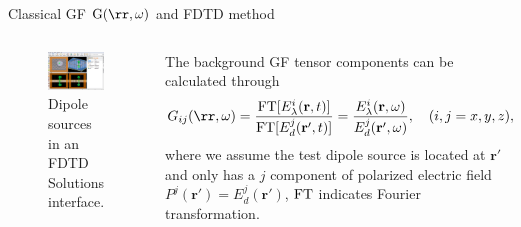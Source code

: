 \documentclass{beamer}
\begin{document}
\begin{frame}{Classical GF $\mathrm{G}(\rr,\omega)$ and FDTD method}
\begin{columns}

 \begin{figure}[htp]%
  \centering
 \begin{center}
 \includegraphics[width=0.99\textwidth]{./Figs/pc_3d_cavity_pc}%
 \end{center}
 \caption[A diagram of FDTD simulation setting.]{\fontsize{8}{-0.2}\selectfont Dipole sources in an FDTD Solutions interface. }
 \label{Cavity_FDTD_Source}
 \end{figure}
 
\fontsize{8}{-0.2}\selectfont

The background GF tensor components can be calculated through
\begin{equation}
 \label{def:GFT}
 G_{ij}(\rr,\omega)=\frac{{\rm FT}[E^i_\lambda(\mathbf{r},t)]}{{\rm FT}[E^j_d(\mathbf{r}',t)]}
=\frac{E^i_\lambda(\mathbf{r},\omega)}{E^j_d(\mathbf{r}',\omega)}, \quad (i,j=x, y, z),\nonumber
\end{equation}
where we assume the test dipole source is located at $\mathbf{r}'$ and only has a $j$ component of polarized electric field $P^j(\mathbf{r}')=E^j_d(\mathbf{r}')$, ${\rm FT}$ indicates Fourier transformation.

\end{columns}
\end{frame}
\end{document}

